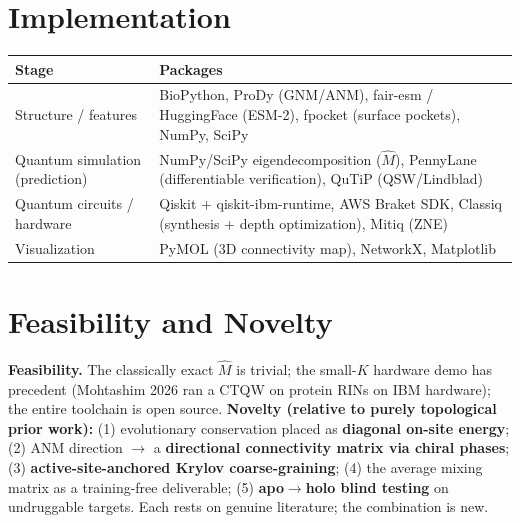 \documentclass[11pt,a4paper]{article}
\newcommand{\mhat}{\hat{M}}
\newcommand{\lead}[1]{\textbf{#1}}
\begin{document}
\section{Implementation}
\begin{center}
\footnotesize
\begin{tabularx}{\linewidth}{@{}>{\raggedright\arraybackslash}p{3.4cm} X@{}}
\toprule
\textbf{Stage} & \textbf{Packages}\\
\midrule
Structure / features & BioPython, ProDy (GNM/ANM), fair-esm / HuggingFace (ESM-2), fpocket (surface pockets), NumPy, SciPy\\
Quantum simulation (prediction) & NumPy/SciPy eigendecomposition ($\mhat$), PennyLane (differentiable verification), QuTiP (QSW/Lindblad)\\
Quantum circuits / hardware & Qiskit + qiskit-ibm-runtime, AWS Braket SDK, Classiq (synthesis + depth optimization), Mitiq (ZNE)\\
Visualization & PyMOL (3D connectivity map), NetworkX, Matplotlib\\
\bottomrule
\end{tabularx}
\end{center}

\section{Feasibility and Novelty}
\lead{Feasibility.} The classically exact $\mhat$ is trivial; the small-$K$ hardware demo has precedent (Mohtashim 2026 ran a CTQW on protein RINs on IBM hardware); the entire toolchain is open source. \lead{Novelty (relative to purely topological prior work):} (1) evolutionary conservation placed as \lead{diagonal on-site energy}; (2) ANM direction $\rightarrow$ a \lead{directional connectivity matrix via chiral phases}; (3) \lead{active-site-anchored Krylov coarse-graining}; (4) the average mixing matrix as a training-free deliverable; (5) \lead{apo$\rightarrow$holo blind testing} on undruggable targets. Each rests on genuine literature; the combination is new.

\end{document}
